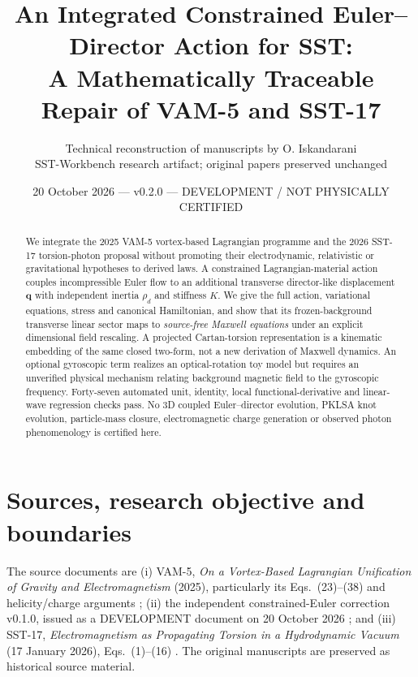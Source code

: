\documentclass[11pt,a4paper]{article}
\newcommand{\rhoD}{\rho_{\!d}}
\newcommand{\qq}{\mathbf q}
\newcommand{\status}{\textcolor{red!65!black}{DEVELOPMENT / NOT PHYSICALLY CERTIFIED}}
\begin{document}
\title{An Integrated Constrained Euler--Director Action for SST:\\
\large A Mathematically Traceable Repair of VAM-5 and SST-17}
\author{Technical reconstruction of manuscripts by O. Iskandarani\\\small SST-Workbench research artifact; original papers preserved unchanged}
\date{20 October 2026 --- v0.2.0 --- \status}
\begin{abstract}
We integrate the 2025 VAM-5 vortex-based Lagrangian programme and the 2026 SST-17 torsion-photon proposal without promoting their electrodynamic, relativistic or gravitational hypotheses to derived laws. A constrained Lagrangian-material action couples incompressible Euler flow to an additional transverse director-like displacement $\qq$ with independent inertia $\rhoD$ and stiffness $K$. We give the full action, variational equations, stress and canonical Hamiltonian, and show that its frozen-background transverse linear sector maps to \emph{source-free Maxwell equations} under an explicit dimensional field rescaling. A projected Cartan-torsion representation is a kinematic embedding of the same closed two-form, not a new derivation of Maxwell dynamics. An optional gyroscopic term realizes an optical-rotation toy model but requires an unverified physical mechanism relating background magnetic field to the gyroscopic frequency. Forty-seven automated unit, identity, local functional-derivative and linear-wave regression checks pass. No 3D coupled Euler--director evolution, PKLSA knot evolution, particle-mass closure, electromagnetic charge generation or observed photon phenomenology is certified here.
\end{abstract}
\maketitle
\tableofcontents
\clearpage

\section{Sources, research objective and boundaries}
The source documents are (i) VAM-5, \emph{On a Vortex-Based Lagrangian Unification of Gravity and Electromagnetism} (2025), particularly its Eqs.~(23)--(38) and helicity/charge arguments \cite{VAM5}; (ii) the independent constrained-Euler correction v0.1.0, issued as a DEVELOPMENT document on 20 October 2026 \cite{Repair01}; and (iii) SST-17, \emph{Electromagnetism as Propagating Torsion in a Hydrodynamic Vacuum} (17 January 2026), Eqs.~(1)--(16) \cite{SST17}. The original manuscripts are preserved as historical source material.
\end{document}
